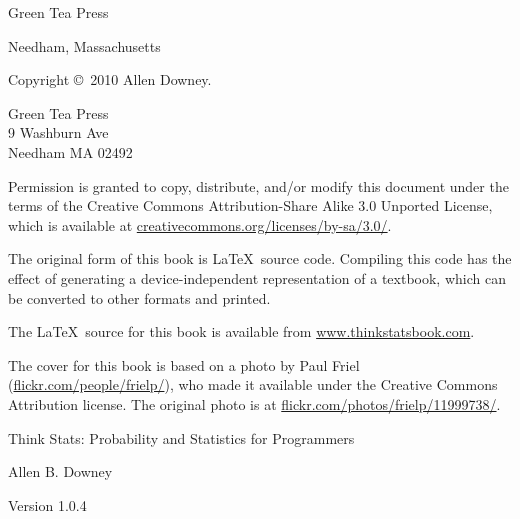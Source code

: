 \documentclass[12pt]{book}
\newcommand{\thetitle}{Think Stats: Probability and Statistics for Programmers}
\newcommand{\theversion}{1.0.4}
\begin{document}
\begin{latexonly}
\begin{flushright}
\vspace{0.5in}

{\Large Green Tea Press}

{\small Needham, Massachusetts}

\vfill

\end{flushright}


\pagebreak
\thispagestyle{empty}

{\small
Copyright \copyright ~2010 Allen Downey.


\vspace{0.2in}

\begin{flushleft}
Green Tea Press       \\
9 Washburn Ave \\
Needham MA 02492
\end{flushleft}

Permission is granted to copy, distribute, and/or modify this document
under the terms of the Creative Commons Attribution-Share Alike 3.0 Unported
License, which is available at \url{creativecommons.org/licenses/by-sa/3.0/}.

The original form of this book is \LaTeX\ source code.  Compiling this
code has the effect of generating a device-independent representation
of a textbook, which can be converted to other formats and printed.

The \LaTeX\ source for this book is available from
\url{www.thinkstatsbook.com}.

The cover for this book is based on a photo by Paul Friel
(\url{flickr.com/people/frielp/}), who made it available under
the Creative Commons Attribution license.  The original photo
is at \url{flickr.com/photos/frielp/11999738/}.

\vspace{0.2in}

} %

\end{latexonly}



\begin{htmlonly}


{\Large \thetitle}

{\large Allen B. Downey}

Version \theversion

\setcounter{chapter}{-1}

\end{htmlonly}
\end{document}
